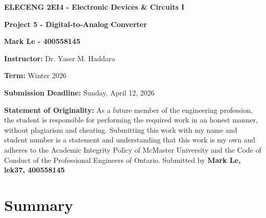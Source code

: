 \documentclass[12pt]{article}
\begin{document}
    
    \begin{titlepage}
    \begin{center}
    \vspace*{\fill}

    {\LARGE \textbf{ELECENG 2EI4 - Electronic Devices \& Circuits I}\par}
    \vspace{2.5cm}

    {\LARGE\bfseries Project 5 - Digital-to-Analog Converter\par}
    \vspace{2.5cm}
    
    {\Large \textbf{Mark Le - 400558145}\par} %
    \vspace{2.5cm}
    
    {\large \textbf{Instructor:} Dr. Yaser M. Haddara\par}
    \vspace{0.5cm}
    {\large \textbf{Term:} Winter 2026 \par} %
    \vspace{0.5cm}
    
    {\large \textbf{Submission Deadline:} Sunday, April 12, 2026\par}
    \end{center}

    \vspace*{\fill}

    \textbf{Statement of Originality:} As a future member of the engineering profession, the student is responsible for performing the required work in an honest manner, without plagiarism and cheating. Submitting this work with my name and student number is a statement and understanding that this work is my own and adheres to the Academic Integrity Policy of McMaster University and the Code of Conduct of the Professional Engineers of Ontario. Submitted by \textbf{Mark Le, lek37, 400558145}

\end{titlepage}

    \newpage
    \tableofcontents

    \listoffigures

    \listoftables

    \newpage

    \section{Summary}
\end{document}
